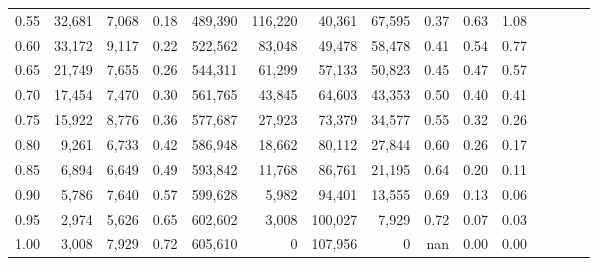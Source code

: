 \begin{tabular}{rrrcrrrrrrrrrrr}
0.55 &  32,681 &  7,068 &                                       0.18 &  489,390 &  116,220 &   40,361 &   67,595 &  0.37 &  0.63 &                         1.08 \\
0.60 &  33,172 &  9,117 &                                       0.22 &  522,562 &   83,048 &   49,478 &   58,478 &  0.41 &  0.54 &                         0.77 \\
0.65 &  21,749 &  7,655 &                                       0.26 &  544,311 &   61,299 &   57,133 &   50,823 &  0.45 &  0.47 &                         0.57 \\
0.70 &  17,454 &  7,470 &                                       0.30 &  561,765 &   43,845 &   64,603 &   43,353 &  0.50 &  0.40 &                         0.41 \\
0.75 &  15,922 &  8,776 &                                       0.36 &  577,687 &   27,923 &   73,379 &   34,577 &  0.55 &  0.32 &                         0.26 \\
0.80 &   9,261 &  6,733 &                                       0.42 &  586,948 &   18,662 &   80,112 &   27,844 &  0.60 &  0.26 &                         0.17 \\
0.85 &   6,894 &  6,649 &                                       0.49 &  593,842 &   11,768 &   86,761 &   21,195 &  0.64 &  0.20 &                         0.11 \\
0.90 &   5,786 &  7,640 &                                       0.57 &  599,628 &    5,982 &   94,401 &   13,555 &  0.69 &  0.13 &                         0.06 \\
0.95 &   2,974 &  5,626 &                                       0.65 &  602,602 &    3,008 &  100,027 &    7,929 &  0.72 &  0.07 &                         0.03 \\
1.00 &   3,008 &  7,929 &                                       0.72 &  605,610 &        0 &  107,956 &        0 &   nan &  0.00 &                         0.00 \\
\bottomrule
\end{tabular}
